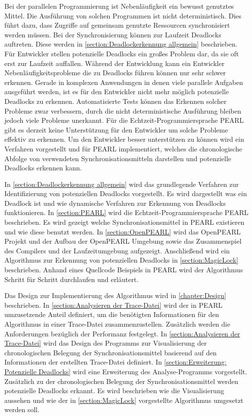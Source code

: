 Bei der parallelen Programmierung ist Nebenläufigkeit ein bewusst genutztes
Mittel. Die Ausführung von solchen Programmen ist nicht deterministisch. Dies
führt dazu, dass Zugriffe auf gemeinsam genutzte Ressourcen synchronisiert
werden müssen. Bei der Synchronisierung können zur Laufzeit Deadlocks auftreten.
Diese werden in \cref{section:Deadlockerkennung allgemein} beschrieben. Für
Entwickler stellen potenzielle Deadlocks ein großes Problem dar, da sie oft erst
zur Laufzeit auffallen. Während der Entwicklung kann ein Entwickler
Nebenläufigkeitsprobleme die zu Deadlocks führen können nur sehr schwer
erkennen. Gerade in komplexen Anwendungen in denen viele parallele Aufgaben
ausgeführt werden, ist es für den Entwickler nicht mehr möglich potenzielle
Deadlocks zu erkennen. Automatisierte Tests können das Erkennen solcher Probleme
zwar verbessern, durch die nicht deterministische Ausführung bleiben jedoch
viele Probleme unerkannt. Für die Echtzeit-Programmiersprache PEARL gibt es
derzeit keine Unterstützung für den Entwickler um solche Probleme effektiv zu
erkennen. Um den Entwickler besser unterstützen zu können wird ein Verfahren
vorgestellt und für PEARL implementiert, welches die chronologische Abfolge von
verwendeten Synchronisationsmitteln darstellen und potenzielle Deadlocks
erkennen kann.

In \cref{section:Deadlockerkennung allgemein} wird das grundlegende Verfahren
zur Identifizierung von potenziellen Deadlocks vorgestellt. Es wird dargestellt
was ein Deadlock ist und wie dynamische Verfahren zur Erkennung von Deadlocks
funktionieren. In \cref{section:PEARL} wird die Echtzeit-Programmiersprache
PEARL \autocite{PEARL} beschrieben. Es wird gezeigt welche
Synchronisationsmittel in PEARL existieren und wie diese benutzt werden. In
\cref{section:OpenPEARL} wird das OpenPEARL Projekt und der Aufbau der OpenPEARL
Umgebung sowie das Zusammenspiel des Compilers und der Laufzeitumgebung
aufgezeigt. Anschließend wird ein Algorithmus zur Erkennung von potenziellen
Deadlocks in \cref{section:MagicLock} beschrieben. Anhand eines Quellcode
Beispiels in PEARL wird der Algorithmus Schritt für Schritt durchlaufen und
erläutert. 

Das Design zur Implementierung des Algorithmus wird in \cref{chapter:Design}
beschrieben. In \cref{section:Analysieren der Trace-Datei} wird der in PEARL
umzusetzende Anteil definiert, um die benötigten Informationen für den
Algorithmus in einer Trace-Datei zusammenzustellen. Zusätzlich werden die
Anforderungen bezüglich der Performanz festgelegt. In \cref{section:Analysieren
der Trace-Datei} wird das Design des Programms zur Visualisierung der
chronologischen Belegung der Synchronisationsmittel basierend auf den
Informationen der erstellten Trace-Datei definiert. In
\cref{section:Erweiterung: Potenzielle Deadlocks} wird eine Erweiterung des
Analyse-Programms vorgestellt. Zusätzlich zu der chronologischen Belegung der
Synchronisationsmittel werden potenzielle Deadlocks erkannt. Es wird beschrieben
wie die Visualisierung aussehen und wie der in \cref{section:MagicLock}
vorgestellte Algorithmus umgesetzt werden soll.

